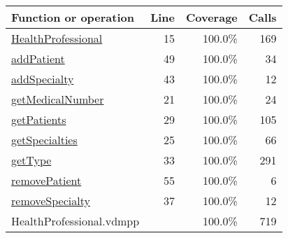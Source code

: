 \bigskip
\begin{longtable}{|l|r|r|r|}
\hline
Function or operation & Line & Coverage & Calls \\
\hline
\hline
\hyperref[HealthProfessional:15]{HealthProfessional} & 15&100.0\% & 169 \\
\hline
\hyperref[addPatient:49]{addPatient} & 49&100.0\% & 34 \\
\hline
\hyperref[addSpecialty:43]{addSpecialty} & 43&100.0\% & 12 \\
\hline
\hyperref[getMedicalNumber:21]{getMedicalNumber} & 21&100.0\% & 24 \\
\hline
\hyperref[getPatients:29]{getPatients} & 29&100.0\% & 105 \\
\hline
\hyperref[getSpecialties:25]{getSpecialties} & 25&100.0\% & 66 \\
\hline
\hyperref[getType:33]{getType} & 33&100.0\% & 291 \\
\hline
\hyperref[removePatient:55]{removePatient} & 55&100.0\% & 6 \\
\hline
\hyperref[removeSpecialty:37]{removeSpecialty} & 37&100.0\% & 12 \\
\hline
\hline
HealthProfessional.vdmpp & & 100.0\% & 719 \\
\hline
\end{longtable}

